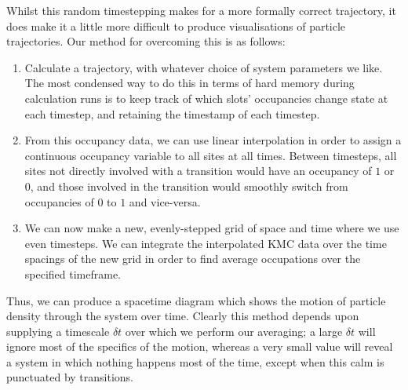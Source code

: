 Whilst this random timestepping makes for a more formally correct trajectory, it does make it a
little more difficult to produce visualisations of particle trajectories. Our method for overcoming
this is as follows:
\begin{enumerate}
 \item Calculate a trajectory, with whatever choice of system parameters we like. The most 
 condensed way to do this in terms of hard memory during calculation runs is to keep track of which
 slots' occupancies change state at each 
 timestep, and retaining the timestamp of each timestep.
 \item From this occupancy data, we can use linear interpolation in order to assign a continuous
 occupancy variable to all sites at all times. Between timesteps, all sites not directly involved
 with a transition would have an occupancy of $1$ or $0$, and those involved in the transition
 would smoothly switch from occupancies of $0$ to $1$ and vice-versa.
 \item We can now make a new, evenly-stepped grid of space and time where we use even timesteps.
 We can integrate the interpolated KMC data over the time spacings of the new grid in order to
 find average occupations over the specified timeframe. 
\end{enumerate}
Thus, we can produce a spacetime diagram which shows the motion of particle density through the 
system over time. Clearly this method depends upon supplying a timescale $\delta t$ over which we
perform our averaging; a large $\delta t$ will ignore most of the specifics of the motion, whereas
a very small value will reveal a system in which nothing happens most of the time, except when
this calm is punctuated by transitions.

